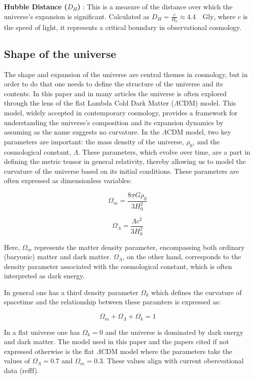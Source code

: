 \documentclass{article}
\begin{document}
\textbf{Hubble Distance ($D_H$) }: This is a measure of the distance over which the universe's expansion is significant. Calculated as 
$D_H = \frac{c}{H_0} \approx 4.4 \quad \text{Gly}$, where $c$ is the speed of light, 
it represents a critical boundary in observational cosmology. %

\subsection{Shape of the universe}


The shape and expansion of the universe are central themes in cosmology, but in order to do that one needs to define the structure of the universe and its contents. 
In this paper and in many articles the universe is
often explored through the lens of the flat Lambda Cold Dark Matter ($\Lambda$CDM) model. 
This model, widely accepted in contemporary cosmology, provides a framework for understanding the universe's composition and its expansion dynamics by assuming as the name suggests no curvature.
In the $\Lambda$CDM model, two key parameters are important: the mass density of the universe, $\rho_0$, and the cosmological constant, $\Lambda$.
These parameters, which evolve over time, are a part in defining the metric tensor in general relativity, thereby allowing us to model the curvature of the universe based on its initial conditions.
These parameters are often expressed as dimensionless variables:

$$
\Omega_m = \frac{8\pi G\rho_0}{3H_0^2}
$$

$$
\Omega_\Lambda = \frac{\Lambda c^2}{3H_0^2}
$$

Here, $\Omega_m$ represents the matter density parameter, encompassing both ordinary (baryonic) matter and dark matter. 
$\Omega_\Lambda$, on the other hand, corresponds to the density parameter associated with the cosmological constant, which is often interpreted as dark energy.




In general one has a third density parameter $\Omega_k$ which defines the curvature of spacetime and the relationship between these paramters is expressed as: 

$$
\Omega_m + \Omega_\Lambda + \Omega_k = 1
$$


In a flat universe one has $\Omega_k = 0$ and the universe is dominated by dark energy and dark matter. The model used in this paper and the papers cited if not expressed otherwise is the flat $\Lambda$CDM model where the parameters take the values of 
$\Omega_\Lambda = 0.7$ and $\Omega_m = 0.3$. These values align with current obersvational data (refff).
\end{document}
